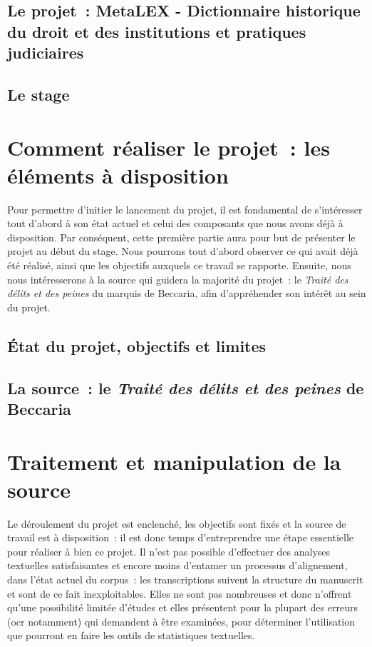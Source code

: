 \documentclass[a4paper,12pt, twoside]{book}
\begin{document}
\chapter{Le projet~: MetaLEX - Dictionnaire historique du droit et des institutions et pratiques judiciaires}

\chapter{Le stage}


\part{Comment réaliser le projet~: les éléments à disposition}
Pour permettre d'initier le lancement du projet, il est fondamental de s'intéresser tout d'abord à son état actuel et celui des composants que nous avons déjà à disposition. 
Par conséquent, cette première partie aura pour but de présenter le projet au début du stage. Nous pourrons tout d'abord observer ce qui avait déjà été réalisé, ainsi que les objectifs auxquels ce travail se rapporte. Ensuite, nous nous intéresserons à la source qui guidera la majorité du projet~: le \emph{Traité des délits et des peines} du marquis de Beccaria, afin d'appréhender son intérêt au sein du projet.

\chapter{État du projet, objectifs et limites}

\chapter{La source~: le \emph{Traité des délits et des peines} de Beccaria}


\part{Traitement et manipulation de la source}
Le déroulement du projet est enclenché, les objectifs sont fixés et la source de travail est à disposition~: il est donc temps d'entreprendre une étape essentielle pour réaliser à bien ce projet. Il n'est pas possible d'effectuer des analyses textuelles satisfaisantes et encore moins d'entamer un processus d'alignement, dans l'état actuel du corpus~: les transcriptions suivent la structure du manuscrit et sont de ce fait inexploitables. Elles ne sont pas nombreuses et donc n'offrent qu'une possibilité limitée d'études et elles présentent pour la plupart des erreurs (\acrshort{ocr} notamment) qui demandent à être examinées, pour déterminer l'utilisation que pourront en faire les outils de statistiques textuelles.
\end{document}
